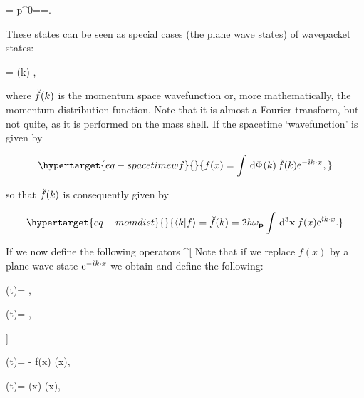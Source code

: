 \documentclass[
  11pt,
  a4paper,
  DIV=11,
  numbers=noendperiod,
  twoside]{scrreprt}
\let\[\relax \let\]\relax %
\DeclareRobustCommand{\[}{\begin{equation}}
\DeclareRobustCommand{\]}{\end{equation}}
\begin{document}
\[\ct{\momop}\momket=\ct{\emom}\momket \quad {} \quad p^0=\hbar\shellen=.\]

These states can be seen as special cases (the plane wave states) of
wavepacket states:

\[=\int {} (k) \momket[k],\]

where \(\breve{f}(k)\) is the momentum space wavefunction or, more
mathematically, the momentum distribution function. Note that it is
almost a Fourier transform, but not quite, as it is performed on the
mass shell. If the spacetime `wavefunction'  is given by

\begin{equation}\protect\hypertarget{eq-spacetimewf}{}{f(x)=\int \ddP{k} \shellft{f}(k) \exp{-\im\lv{k}\cdot\lv{x}},}\label{eq-spacetimewf}\end{equation}

so that \(\breve{f}(k)\) is consequently given by

\begin{equation}\protect\hypertarget{eq-momdist}{}{\ip{k}{f}=\shellft{f}(k)= 2 \hbar\shellen \int \dd[3]{\tv{x}}f(x) \exp{\im k\cdot x}.}\label{eq-momdist}\end{equation}

If we now define the following operators
\^{}{[} Note that if we replace \(f(x)\) by a plane wave state
\(\mathrm{e}^{-\mathring{\imath} k\cdot x}\) we obtain and define the following:

\[
\createop[\tv{k}](t)=  \int {}  ,
\]

\[
\annihilop[\tv{k}](t)=   \int {}  ,
\]

{]}

\[
\createop[f](t)= -  \im \int {}f(x) \lrder[0] \scf(x),
\]

\[
\annihilop[f](t)=   \im \int {}(x) \lrder[0] \scf(x),
\]
\end{document}
